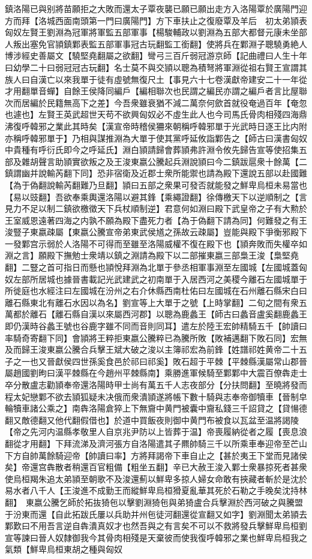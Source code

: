 鎮洛陽已與别將苗願拒之大敗而還太子覃夜襲已願已願出走方入洛陽覃於廣陽門迎方而拜【洛城西面南頭第一門曰廣陽門】方下車扶止之復廢覃及羊后　初太弟頴表匈奴左賢王劉淵為冠軍將軍監五部軍事【楊駿輔政以劉淵為五部大都督元康未坐部人叛出塞免官頴鎮鄴表監五部軍事冠古玩翻監工銜翻】使將兵在鄴淵子聰驍勇絶人博涉經史善屬文【驍堅堯翻屬之欲翻】彎弓三百斤弱冠游京師【記曲禮曰人生十年曰幼學二十曰弱冠冠古玩翻】名士莫不與交頴以聰為積弩將軍淵從祖右賢王宣謂其族人曰自漢亡以來我單于徒有虛號無復尺土【事見六十七卷漢獻帝建安二十一年從才用翻單音蟬】自餘王侯降同編戶【編相聯次也民謂之編民亦謂之編戶者言比屋聯次而居編於民籍無高下之差】今吾衆雖衰猶不減二萬奈何歛首就役奄過百年【奄忽也遽也】左賢王英武超世天苟不欲興匈奴必不虛生此人也今司馬氏骨肉相殘四海鼎沸復呼韓邪之業此其時矣【漢宣帝時稽侯狦來朝稱呼韓邪單于光武時日逐王比内附亦稱呼韓邪單于】乃相與謀推淵為大單于使其黨呼延攸詣鄴告之【師古曰漢書匈奴中貴種有呼衍氏即今之呼延氏】淵白頴請歸會葬頴弗許淵令攸先歸告宣等使招集五部及雜胡聲言助頴實欲叛之及王浚東嬴公騰起兵淵說頴曰今二鎮跋扈衆十餘萬【二鎮謂幽并說輸芮翻下同】恐非宿衛及近郡士衆所能禦也請為殿下還說五部以赴國難【為于偽翻說輸芮翻難乃旦翻】頴曰五部之衆果可發否就能發之鮮卑烏桓未易當也【易以豉翻】吾欲奉乘輿還洛陽以避其鋒【乘繩證翻】徐傳檄天下以逆順制之【言見力不足以制二鎮欲檄徵天下兵杖順制逆】君意何如淵曰殿下武皇帝之子有大勲於王室威恩遠著四海之内孰不願為殿下盡死力者【為于偽翻下請為同】何難發之有王浚豎子東嬴疎屬【東嬴公騰宣帝弟東武侯馗之孫故云疎屬】豈能與殿下爭衡邪殿下一發鄴宫示弱於人洛陽不可得而至雖至洛陽威權不復在殿下也【頴奔敗而失權卒如淵之言】願殿下撫勉士衆靖以鎮之淵請為殿下以二部摧東嬴三部梟王浚【梟堅堯翻】二豎之首可指日而懸也頴悅拜淵為北單于參丞相軍事淵至左國城【左國城蓋匈奴左部所居城也據晉書載記光武建武之初南單于入居西河之美稷今離石左國城單于所徙庭也水經注曰左國城在汾州之右介休縣西南杜佑曰左國城在石州離石縣宋白曰離石縣東北有離石水因以為名】劉宣等上大單于之號【上時掌翻】二旬之間有衆五萬都於離石【離石縣自漢以來屬西河郡】以聰為鹿蠡王【師古曰蠡音盧奚翻鹿蠡王即仍漢時谷蠡王號也谷鹿字雖不同而音則同耳】遣左於陸王宏帥精騎五千【帥讀曰率騎奇寄翻下同】會頴將王粹拒東嬴公騰粹已為騰所敗【敗補邁翻下敗石同】宏無及而歸王浚東嬴公騰合兵擊王斌大破之浚以主簿祁宏為前鋒【姓譜祁姓黄帝二十五子之一也又晉獻侯四世孫奚食邑於祁曰祁奚】敗石超于平棘【平棘縣漢屬常山郡晉屬趙國劉昫曰漢平棘縣在今趙州平棘縣南】乘勝進軍候騎至鄴鄴中大震百僚犇走士卒分散盧志勸頴奉帝還洛陽時甲士尚有萬五千人志夜部分【分扶問翻】至曉將發而程太妃戀鄴不欲去頴狐疑未决俄而衆潰頴遂將帳下數十騎與志奉帝御犢車【晉制皁輪犢車諸公乘之】南犇洛陽倉猝上下無齎中黄門被囊中齎私錢三千詔貸之【貸愓德翻又敵德翻又他代翻假借也】於道中買飯夜則御中黄門布被食以瓦盆至温將謁陵【帝之先河内温縣孝敬里人自京兆尹防以上皆葬于温】帝喪履納從者之履【喪息浪翻從才用翻】下拜流涕及濟河張方自洛陽遣其子羆帥騎三千以所乘車奉迎帝至芒山下方自帥萬餘騎迎帝【帥讀曰率】方將拜謁帝下車自止之【甚於夷王下堂而見諸侯矣】帝還宫犇散者稍還百官粗備【粗坐五翻】辛已大赦王浚入鄴士衆暴掠死者甚衆使烏桓羯朱追太弟頴至朝歌不及浚還薊以鮮卑多掠人婦女命敢有挾藏者斬於是沈於易水者八千人【王浚進不成勤王而縱鮮卑烏桓猾夏亂華其死於石勒之手晚矣沈持林翻】　東嬴公騰乞師於拓抜猗㐌以擊劉淵猗㐌與弟猗盧合兵擊淵於西河破之與騰盟于汾東而還【自此拓跋氏屢以兵助并州㐌徒河翻還從宣翻又如字】劉淵聞太弟頴去鄴歎曰不用吾言逆自犇潰真奴才也然吾與之有言矣不可以不救將發兵擊鮮卑烏桓劉宣等諫曰晉人奴隸御我今其骨肉相殘是天棄彼而使我復呼韓邪之業也鮮卑烏桓我之氣類【鮮卑烏桓東胡之種與匈奴
